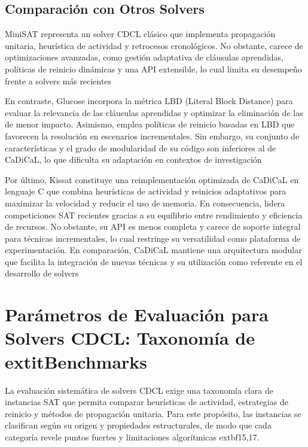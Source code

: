 \subsection{Comparación con Otros Solvers}

MiniSAT representa un solver CDCL clásico que implementa propagación unitaria, heurística de actividad y retrocesos cronológicos. No obstante, carece de optimizaciones avanzadas, como gestión adaptativa de cláusulas aprendidas, políticas de reinicio dinámicas y una API extensible, lo cual limita su desempeño frente a solvers más recientes %

En contraste, Glucose incorpora la métrica LBD (Literal Block Distance) para evaluar la relevancia de las cláusulas aprendidas y optimizar la eliminación de las de menor impacto. Asimismo, emplea políticas de reinicio basadas en LBD que favorecen la resolución en escenarios incrementales. Sin embargo, su conjunto de características y el grado de modularidad de su código son inferiores al de CaDiCaL, lo que dificulta su adaptación en contextos de investigación %

Por último, Kissat constituye una reimplementación optimizada de CaDiCaL en lenguaje C que combina heurísticas de actividad y reinicios adaptativos para maximizar la velocidad y reducir el uso de memoria. En consecuencia, lidera competiciones SAT recientes gracias a su equilibrio entre rendimiento y eficiencia de recursos. No obstante, su API es menos completa y carece de soporte integral para técnicas incrementales, lo cual restringe su versatilidad como plataforma de experimentación. En comparación, CaDiCaL mantiene una arquitectura modular que facilita la integración de nuevas técnicas y su utilización como referente en el desarrollo de solvers %


\section{Parámetros de Evaluación para Solvers CDCL: Taxonomía de 	extit{Benchmarks}}
\label{sec:tipos-problemas}
La evaluación sistemática de solvers CDCL exige una taxonomía clara de instancias SAT que permita comparar heurísticas de actividad, estrategias de reinicio y métodos de propagación unitaria. Para este propósito, las instancias se clasifican según su origen y propiedades estructurales, de modo que cada categoría revele puntos fuertes y limitaciones algorítmicas 	extbf{15,17}.

